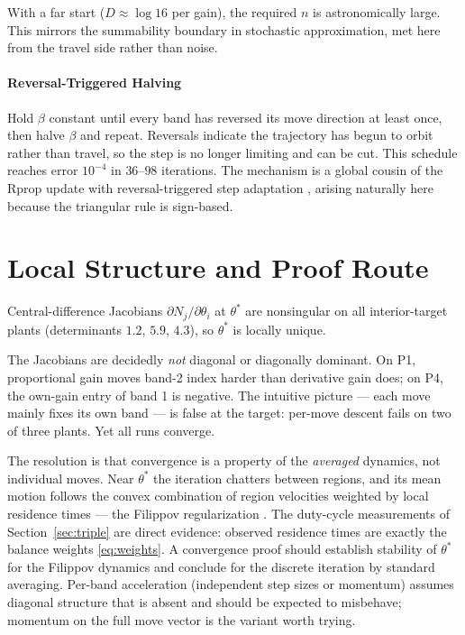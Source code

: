 \documentclass[twocolumn]{ifacconf}
\begin{document}
With a far start ($D \approx \log 16$ per gain), the required $n$ is
astronomically large. This mirrors the summability boundary in stochastic
approximation, met here from the travel side rather than noise.

\paragraph{Reversal-Triggered Halving} Hold $\beta$ constant until every band
has reversed its move direction at least once, then halve $\beta$ and repeat.
Reversals indicate the trajectory has begun to orbit rather than travel, so the
step is no longer limiting and can be cut. This schedule reaches error $10^{-4}$
in $36$--$98$ iterations. The mechanism is a global cousin of the Rprop
update with reversal-triggered step adaptation \cite{Riedmiller1993}, arising
naturally here because the triangular rule is sign-based.

\section{Local Structure and Proof Route}
\label{sec:structure}

Central-difference Jacobians $\partial N_j / \partial \theta_i$ at $\theta^*$ are
nonsingular on all interior-target plants (determinants $1.2$, $5.9$, $4.3$),
so $\theta^*$ is locally unique.

The Jacobians are decidedly \emph{not} diagonal or diagonally dominant. On P1,
proportional gain moves band-2 index harder than derivative gain does; on P4,
the own-gain entry of band 1 is negative. The intuitive picture --- each move
mainly fixes its own band --- is false at the target: per-move descent fails on
two of three plants. Yet all runs converge.

The resolution is that convergence is a property of the \emph{averaged}
dynamics, not individual moves. Near $\theta^*$ the iteration chatters between
regions, and its mean motion follows the convex combination of region
velocities weighted by local residence times --- the Filippov regularization
\cite{Filippov1988}. The duty-cycle measurements of Section~\ref{sec:triple}
are direct evidence: observed residence times are exactly the balance weights
\eqref{eq:weights}. A convergence proof should establish stability of $\theta^*$
for the Filippov dynamics and conclude for the discrete iteration by standard
averaging. Per-band acceleration (independent step sizes or momentum) assumes
diagonal structure that is absent and should be expected to misbehave; momentum
on the full move vector is the variant worth trying.
\end{document}
